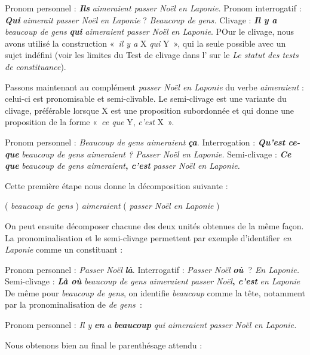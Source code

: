 \ea
\ea Pronom personnel : \textbf{\textit{Ils}} \textit{aimeraient passer Noël} \textit{en Laponie.}
\ex Pronom interrogatif : \textbf{\textit{Qui}} \textit{aimerait passer Noël} \textit{en Laponie} ? \textit{Beaucoup de} \textit{gens.}
\ex Clivage : \textbf{\textit{Il y a}} \textit{beaucoup de gens} \textbf{\textit{qui}} \textit{aimeraient passer Noël} \textit{en Laponie}.
\z\z
POur le clivage, nous avons utilisé la construction «~\textit{il y a} X \textit{qui} Y~», qui la seule possible avec un sujet indéfini (voir les limites du Test de clivage dans l' sur le \textit{Le statut des tests de constituance}).

Passons maintenant au complément \textit{passer Noël en Laponie} du verbe \textit{aimeraient} : celui-ci est pronomisable et semi-clivable. Le semi-clivage est une variante du clivage, préférable lorsque X est une proposition subordonnée et qui donne une proposition de la forme «~\textit{ce que}
Y, \textit{c'est} X~».

\ea
  \ea Pronom personnel : \textit{Beaucoup de gens aimeraient} \textbf{\textit{ça}}.
  \ex Interrogation : \textbf{\textit{Qu’est} \textit{ce-que}} \textit{beaucoup de gens aimeraient ? Passer Noël en Laponie.}
  \ex Semi-clivage : \textbf{\textit{Ce que}} \textit{beaucoup de gens aimeraient}\textbf{, \textit{c’est}} \textit{passer Noël en Laponie.}
\z\z

Cette première étape nous donne la décomposition suivante :

\ea
   ( \textit{beaucoup de gens} ) \textit{aimeraient} ( \textit{passer Noël en Laponie} )
\z

On peut ensuite décomposer chacune des deux unités obtenues de la même façon. La pronominalisation et le semi-clivage permettent par exemple d’identifier \textit{en Laponie} comme un constituant :

\ea
\ea Pronom personnel : \textit{Passer Noël} \textbf{\textit{là}}.
\ex Interrogatif : \textit{Passer Noël} \textbf{\textit{où~}}? \textit{En Laponie.}
\ex Semi-clivage :  \textbf{\textit{Là où}} \textit{beaucoup de gens aimeraient passer Noël}\textbf{, \textit{c’est}} \textit{en Laponie}
\z\z
De même pour \textit{beaucoup de gens}, on identifie \textit{beaucoup} comme la tête, notamment par la pronominalisation de \textit{de gens~}:

\ea
Pronom personnel : \textit{Il y} \textbf{\textit{en}} \textit{a} \textbf{\textit{beaucoup}} \textit{qui aimeraient passer Noël en Laponie.}    
\z

Nous obtenons bien au final le parenthésage attendu :

